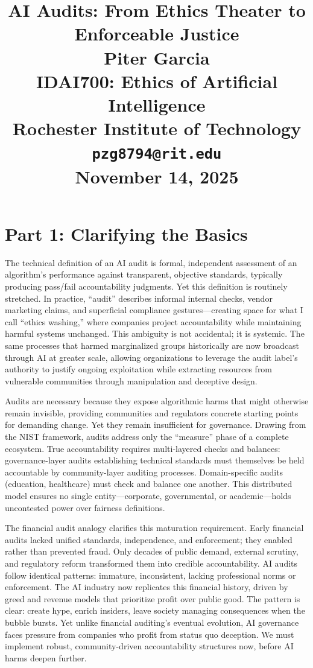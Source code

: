 \documentclass[12pt,twoside]{article}
\title{
\vspace*{1.5in}
\textbf{\Huge AI Audits: From Ethics Theater to Enforceable Justice}\\[1.5em]

\vfill
\Huge \textbf{Piter Garcia}\\
\LARGE IDAI700: Ethics of Artificial Intelligence\\
Rochester Institute of Technology\\
\texttt{pzg8794@rit.edu}\\

\vfill
\Huge \textbf{November 14, 2025}
}
\author{}
\date{}
\begin{document}
\thispagestyle{empty}
\maketitle
\newpage

\pagestyle{fancy}

\section{Part 1: Clarifying the Basics}

The technical definition of an AI audit is formal, independent assessment of an algorithm's performance against transparent, objective standards, typically producing pass/fail accountability judgments. Yet this definition is routinely stretched. In practice, ``audit'' describes informal internal checks, vendor marketing claims, and superficial compliance gestures—creating space for what I call ``ethics washing,'' where companies project accountability while maintaining harmful systems unchanged. This ambiguity is not accidental; it is systemic. The same processes that harmed marginalized groups historically are now broadcast through AI at greater scale, allowing organizations to leverage the audit label's authority to justify ongoing exploitation while extracting resources from vulnerable communities through manipulation and deceptive design.

Audits are necessary because they expose algorithmic harms that might otherwise remain invisible, providing communities and regulators concrete starting points for demanding change. Yet they remain insufficient for governance. Drawing from the NIST framework, audits address only the ``measure'' phase of a complete ecosystem. True accountability requires multi-layered checks and balances: governance-layer audits establishing technical standards must themselves be held accountable by community-layer auditing processes. Domain-specific audits (education, healthcare) must check and balance one another. This distributed model ensures no single entity—corporate, governmental, or academic—holds uncontested power over fairness definitions.

The financial audit analogy clarifies this maturation requirement. Early financial audits lacked unified standards, independence, and enforcement; they enabled rather than prevented fraud. Only decades of public demand, external scrutiny, and regulatory reform transformed them into credible accountability. AI audits follow identical patterns: immature, inconsistent, lacking professional norms or enforcement. The AI industry now replicates this financial history, driven by greed and revenue models that prioritize profit over public good. The pattern is clear: create hype, enrich insiders, leave society managing consequences when the bubble bursts. Yet unlike financial auditing's eventual evolution, AI governance faces pressure from companies who profit from status quo deception. We must implement robust, community-driven accountability structures now, before AI harms deepen further.
\end{document}

